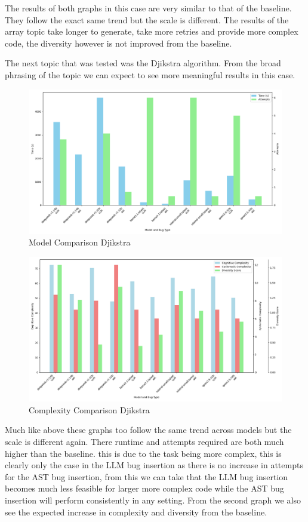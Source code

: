 \documentclass[12pt]{extarticle}
\begin{document}
The results of both graphs in this case are very similar to that of the baseline. They follow the exact same trend but the scale is different. The results of the array topic take longer to generate, take more retries and provide more complex code, the diversity however is not improved from the baseline.

The next topic that was tested was the Djikstra algorithm. From the broad phrasing of the topic we can expect to see more meaningful results in this case.

\begin{figure}[h!]
\centering
\includegraphics[width=0.8\linewidth]{Images/Model_Comparison_Djikstra.png}
\caption{Model Comparison Djikstra}
\label{fig:Model_Comparison_Djikstra}
\end{figure}

\begin{figure}[h!]
\centering
\includegraphics[width=0.8\linewidth]{Images/Complexity_Comparison_Djikstra.png}
\caption{Complexity Comparison Djikstra}
\label{fig:Complexity_Comparison_Djikstra}
\end{figure}

Much like above these graphs too follow the same trend across models but the scale is different again. There runtime and attempts required are both much higher than the baseline. this is due to the task being more complex, this is clearly only the case in the LLM bug insertion as there is no increase in attempts for the AST bug insertion, from this we can take that the LLM bug insertion becomes much less feasible for larger more complex code while the AST bug insertion will perform consistently in any setting. From the second graph we also see the expected increase in complexity and diversity from the baseline.
\end{document}

